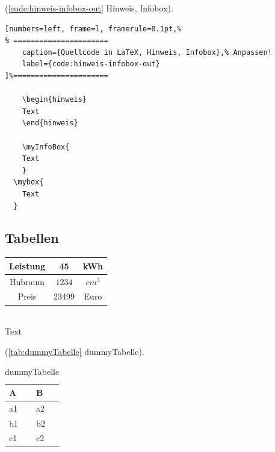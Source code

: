 

(\autoref{code:hinweis-infobox-out} Hinweis, Infobox).
\lstset{language=[LaTeX]TeX} %
\begin{lstlisting}[numbers=left, frame=l, framerule=0.1pt,%
% ======================
	caption={Quellcode in LaTeX, Hinweis, Infobox},% Anpassen!
	label={code:hinweis-infobox-out}
]%======================

	\begin{hinweis}
    Text
	\end{hinweis}

	\myInfoBox{
    Text
	}
  \mybox{
    Text
  }
\end{lstlisting}

\newpage %

\subsection{Tabellen}\label{sec:tabellen}

\begin{tabular}{ccc}
	\toprule
		Leistung & 45 & kWh \\
	\midrule
		Hubraum & $1234$ & $cm^3$ \\
		Preis & 23499 & Euro \\
	\bottomrule
\end{tabular}\\

Text

(\autoref{tab:dummyTabelle} dummyTabelle).
\begin{table}[!hb] %
	\centering
	\begin{tabular} {ll}
		\toprule
			\textbf{A} & \textbf{B} \\
		\midrule
			a1 & a2 \\
			b1 & b2 \\
			c1 & c2 \\
		\bottomrule
	\end{tabular}
		\caption{dummyTabelle}          %
		\label{tab:dummyTabelle}        %
\end{table}


